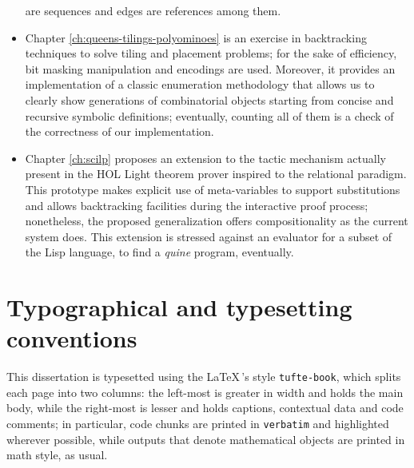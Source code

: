 \begin{itemize}
are sequences and edges are references among them.
\item Chapter \ref{ch:queens-tilings-polyominoes} is an exercise in
backtracking techniques to solve tiling and placement problems; for the sake of
efficiency, bit masking manipulation and encodings are used. Moreover, it
provides an implementation of a classic enumeration methodology that allows us
to clearly show generations of combinatorial objects starting from concise and
recursive symbolic definitions; eventually, counting all of them is a check of
the correctness of our implementation.
\item Chapter \ref{ch:scilp} proposes an extension to the tactic mechanism
actually present in the HOL Light theorem prover inspired to the relational
paradigm. This prototype makes explicit use of meta-variables to support
substitutions and allows backtracking facilities during the interactive proof
process; nonetheless, the proposed generalization offers compositionality as
the current system does. This extension is stressed against an evaluator for a
subset of the Lisp language, to find a \textit{quine} program, eventually.
\end{itemize}

\section*{Typographical and typesetting conventions}

This dissertation is typesetted using the \LaTeX\,'s style \verb|tufte-book|,
which splits each page into two columns: the left-most is greater in width and
holds the main body, while the right-most is lesser and holds captions,
contextual data and code comments; in particular, code chunks are printed in
\verb|verbatim| and highlighted wherever possible, while outputs that denote
mathematical objects are printed in math style, as usual.




